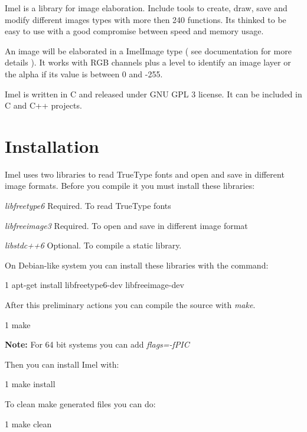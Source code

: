 Imel is a library for image elaboration. Include tools to create, draw, save and modify different images types with more then 240 functions. It\textquotesingle{}s thinked to be easy to use with a good compromise between speed and memory usage.

An image will be elaborated in a Imel\+Image type ( see documentation for more details ). It works with R\+GB channels plus a level to identify an image layer or the alpha if its value is between 0 and -\/255.

Imel is written in C and released under G\+NU G\+PL 3 license. It can be included in C and C++ projects.

\section*{Installation}

Imel uses two libraries to read True\+Type fonts and open and save in different image formats. Before you compile it you must install these libraries\+:


\begin{DoxyItemize}
\item {\itshape libfreetype6} Required. To read True\+Type fonts
\item {\itshape libfreeimage3} Required. To open and save in different image format
\item {\itshape libstdc++6} Optional. To compile a static library.
\end{DoxyItemize}

On Debian-\/like system you can install these libraries with the command\+: 
\begin{DoxyCode}
1 apt-get install libfreetype6-dev libfreeimage-dev
\end{DoxyCode}


After this preliminary actions you can compile the source with {\itshape make}. 
\begin{DoxyCode}
1 make
\end{DoxyCode}
 {\bfseries Note\+:} For 64 bit systems you can add {\itshape flags=\textquotesingle{}-\/f\+P\+IC\textquotesingle{}}

Then you can install Imel with\+: 
\begin{DoxyCode}
1 make install
\end{DoxyCode}


To clean make generated files you can do\+: 
\begin{DoxyCode}
1 make clean
\end{DoxyCode}


